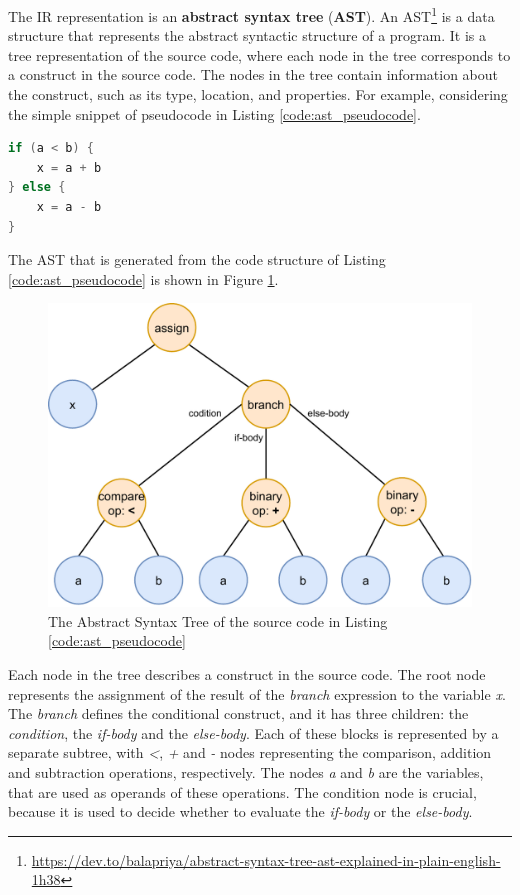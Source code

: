 The IR representation is an \textbf{abstract syntax tree} (\textbf{AST}). An AST\footnote{\url{https://dev.to/balapriya/abstract-syntax-tree-ast-explained-in-plain-english-1h38}} is a data structure that represents the abstract syntactic structure of a program. It is a tree representation of the source code, where each node in the tree corresponds to a construct in the source code. The nodes in the tree contain information about the construct, such as its type, location, and properties.\newline
For example, considering the simple snippet of pseudocode in Listing \ref{code:ast_pseudocode}.
\begin{lstlisting}[caption={Pseudocode of a simple assignment and expression}, language=Kotlin, captionpos=b, label={code:ast_pseudocode}]
if (a < b) {
    x = a + b
} else {
    x = a - b
}
\end{lstlisting}
The AST that is generated from the code structure of Listing \ref{code:ast_pseudocode} is shown in Figure \ref{fig:ast_pseudocode_example}.
\begin{figure}[!ht]
    \centering
    \includegraphics[scale=0.8]{document/chapters/2-metaprogramming/images/ast_pseudocode_example.pdf}
    \caption{The Abstract Syntax Tree of the source code in Listing \ref{code:ast_pseudocode}}
    \label{fig:ast_pseudocode_example}
\end{figure}
Each node in the tree describes a construct in the source code. The root node represents the assignment of the result of the \textit{branch} expression to the variable \textit{x}. The \textit{branch} defines the conditional construct, and it has three children: the \textit{condition}, the \textit{if-body} and the \textit{else-body}. Each of these blocks is represented by a separate subtree, with \textit{<}, \textit{+} and \textit{-} nodes representing the comparison, addition and subtraction operations, respectively. The nodes \textit{a} and \textit{b} are the variables, that are used as operands of these operations.\newline
The condition node is crucial, because it is used to decide whether to evaluate the \textit{if-body} or the \textit{else-body}.

